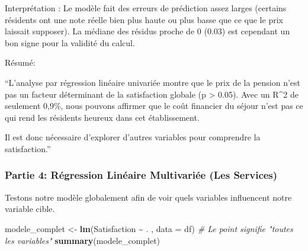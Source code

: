 \documentclass[
]{article}
\newenvironment{Shaded}{\begin{snugshade}}{\end{snugshade}}
\newcommand{\AttributeTok}[1]{\textcolor[rgb]{0.13,0.29,0.53}{#1}}
\newcommand{\CommentTok}[1]{\textcolor[rgb]{0.56,0.35,0.01}{\textit{#1}}}
\newcommand{\FunctionTok}[1]{\textcolor[rgb]{0.13,0.29,0.53}{\textbf{#1}}}
\newcommand{\NormalTok}[1]{#1}
\newcommand{\OtherTok}[1]{\textcolor[rgb]{0.56,0.35,0.01}{#1}}
\newcommand{\SpecialCharTok}[1]{\textcolor[rgb]{0.81,0.36,0.00}{\textbf{#1}}}
\begin{document}
Interprétation : Le modèle fait des erreurs de prédiction assez larges
(certains résidents ont une note réelle bien plus haute ou plus basse
que ce que le prix laissait supposer). La médiane des résidus proche de
0 (0.03) est cependant un bon signe pour la validité du calcul.

Résumé:

``L'analyse par régression linéaire univariée montre que le prix de la
pension n'est pas un facteur déterminant de la satisfaction globale (p
\textgreater{} 0.05). Avec un R\^{}2 de seulement 0,9\%, nous pouvons
affirmer que le coût financier du séjour n'est pas ce qui rend les
résidents heureux dans cet établissement.

Il est donc nécessaire d'explorer d'autres variables pour comprendre la
satisfaction.''

\subsubsection{Partie 4: Régression Linéaire Multivariée (Les
Services)}\label{partie-4-ruxe9gression-linuxe9aire-multivariuxe9e-les-services}

Testons notre modèle globalement afin de voir quels variables
influencent notre variable cible.

\begin{Shaded}
\begin{Highlighting}[]
\NormalTok{modele\_complet }\OtherTok{\textless{}{-}} \FunctionTok{lm}\NormalTok{(Satisfaction }\SpecialCharTok{\textasciitilde{}}\NormalTok{ . , }\AttributeTok{data =}\NormalTok{ df) }\CommentTok{\# Le point signifie "toutes les variables"}
\FunctionTok{summary}\NormalTok{(modele\_complet)}
\end{Highlighting}
\end{Shaded}
\end{document}
